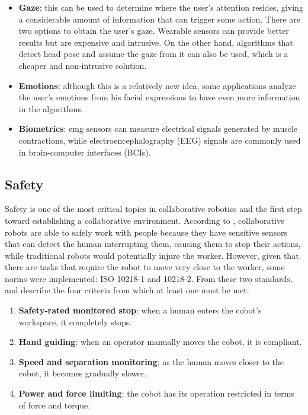 \begin{itemize}
\item \textbf{Gaze}: this can be used to determine where the user's attention resides, giving a considerable amount of information that can trigger some action. There are two options to obtain the user's gaze. Wearable sensors can provide better results but are expensive and intrusive. On the other hand, algorithms that detect head pose and assume the gaze from it can also be used, which is a cheaper and non-intrusive solution.

\item \textbf{Emotions}: although this is a relatively new idea, some applications analyze the user's emotions from his facial expressions to have even more information in the algorithms.

\item \textbf{Biometrics}: \acf{emg} sensors can measure electrical signals generated by muscle contractions, while electroencephalography (EEG) signals are commonly used in brain-computer interfaces (BCIs). %

\end{itemize}

\subsection{Safety}

Safety is one of the most critical topics in collaborative robotics and the first step toward establishing a collaborative environment. According to \cite{CobotsWW}, collaborative robots are able to safely work with people because they have sensitive sensors that can detect the human interrupting them, causing them to stop their actions, while traditional robots would potentially injure the worker. However, given that there are tasks that require the robot to move very close to the worker, some norms were implemented: ISO 10218-1 and 10218-2. From these two standards, \textcite{Castro2021} and \textcite{Villani2018} describe the four criteria from which at least one must be met:
\begin{enumerate}
  \item \textbf{Safety-rated monitored stop}: when a human enters the cobot's workspace, it completely stops.
  \item \textbf{Hand guiding}: when an operator manually moves the cobot, it is compliant.
  \item \textbf{Speed and separation monitoring}: as the human moves closer to the cobot, it becomes gradually slower.
  \item \textbf{Power and force limiting}: the cobot has its operation restricted in terms of force and torque.
\end{enumerate}

